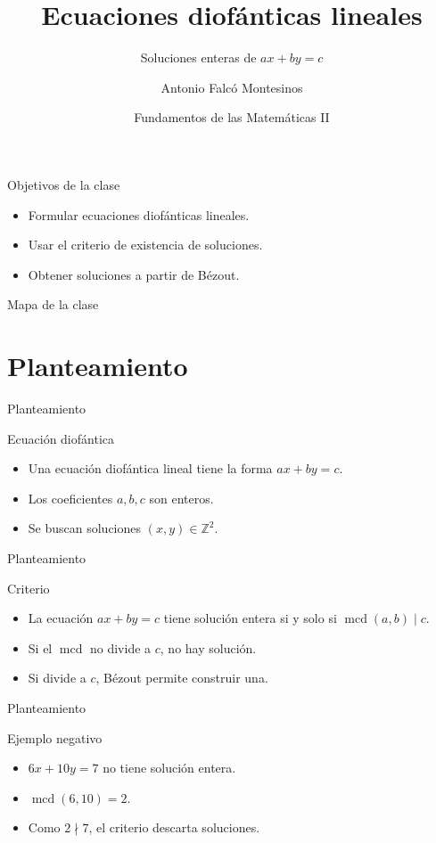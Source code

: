 \documentclass[aspectratio=169,11pt]{beamer}
\title[FdM II -- Clase 06]{Ecuaciones diofánticas lineales}
\subtitle{Soluciones enteras de \(ax+by=c\)}
\author{Antonio Falcó Montesinos}
\institute{Universidad CEU Cardenal Herrera}
\date{Fundamentos de las Matemáticas II}
\newcommand{\mcd}{\operatorname{mcd}}
\begin{document}
\begin{frame}
  \titlepage
\end{frame}

\begin{frame}{Objetivos de la clase}
\begin{itemize}
  \item Formular ecuaciones diofánticas lineales.
  \item Usar el criterio de existencia de soluciones.
  \item Obtener soluciones a partir de Bézout.
\end{itemize}
\end{frame}

\begin{frame}{Mapa de la clase}
\tableofcontents
\end{frame}

\section{Planteamiento}

\begin{frame}{Planteamiento}
\begin{block}{Ecuación diofántica}
\begin{itemize}
  \item Una ecuación diofántica lineal tiene la forma \(ax+by=c\).
  \item Los coeficientes \(a,b,c\) son enteros.
  \item Se buscan soluciones \((x,y)\in\mathbb{Z}^2\).
\end{itemize}
\end{block}
\end{frame}

\begin{frame}{Planteamiento}
\begin{block}{Criterio}
\begin{itemize}
  \item La ecuación \(ax+by=c\) tiene solución entera si y solo si \(\mcd(a,b)\mid c\).
  \item Si el \(\mcd\) no divide a \(c\), no hay solución.
  \item Si divide a \(c\), Bézout permite construir una.
\end{itemize}
\end{block}
\end{frame}

\begin{frame}{Planteamiento}
\begin{block}{Ejemplo negativo}
\begin{itemize}
  \item \(6x+10y=7\) no tiene solución entera.
  \item \(\mcd(6,10)=2\).
  \item Como \(2\nmid 7\), el criterio descarta soluciones.
\end{itemize}
\end{block}
\end{frame}
\end{document}
